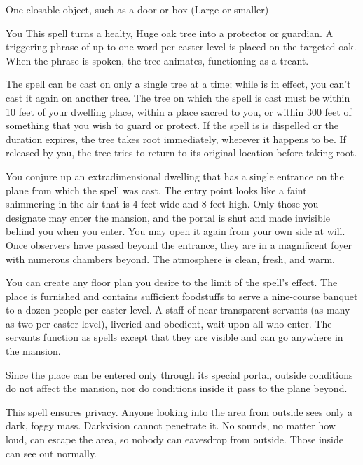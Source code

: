 \begin{spelltarget}{One closable object, such as a door or box (Large or smaller)}
\begin{spelltarget}{You}
\spelleffect This spell turns a healty, Huge oak tree into a protector or guardian. A triggering phrase of up to one word per caster level is placed on the targeted oak. When the phrase is spoken, the tree animates, functioning as a treant.
\par The spell can be cast on only a single tree at a time; while  is in effect, you can't cast it again on another tree. The tree on which the spell is cast must be within 10 feet of your dwelling place, within a place sacred to you, or within 300 feet of something that you wish to guard or protect.
\spellnotes If the spell is is dispelled or the duration expires, the tree takes root immediately, wherever it happens to be. If released by you, the tree tries to return to its original location before taking root.

\spelleffect 
{}
\spelleffect You conjure up an extradimensional dwelling that has a single entrance on the plane from which the spell was cast. The entry point looks like a faint shimmering in the air that is 4 feet wide and 8 feet high. Only those you designate may enter the mansion, and the portal is shut and made invisible behind you when you enter. You may open it again from your own side at will. Once observers have passed beyond the entrance, they are in a magnificent foyer with numerous chambers beyond. The atmosphere is clean, fresh, and warm.
\par You can create any floor plan you desire to the limit of the spell's effect. The place is furnished and contains sufficient foodstuffs to serve a nine-course banquet to a dozen people per caster level. A staff of near-transparent servants (as many as two per caster level), liveried and obedient, wait upon all who enter. The servants function as  spells except that they are visible and can go anywhere in the mansion.
\par Since the place can be entered only through its special portal, outside conditions do not affect the mansion, nor do conditions inside it pass to the plane beyond.

\spelldur{\durext \dismissable}
\spelleffect This spell ensures privacy. Anyone looking into the area from outside sees only a dark, foggy mass. Darkvision cannot penetrate it. No sounds, no matter how loud, can escape the area, so nobody can eavesdrop from outside. Those inside can see out normally.


\end{spelltarget}
\end{spelltarget}
